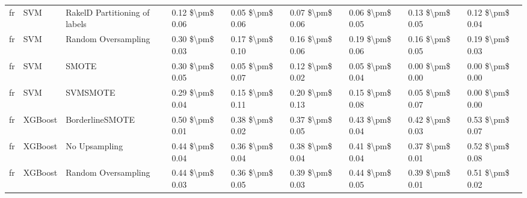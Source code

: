 \begin{tabular}{lllllllll}
      fr &                             SVM & RakelD Partitioning of labels & 0.12 \$\textbackslash pm\$ 0.06 &           0.05 \$\textbackslash pm\$ 0.06 &       0.07 \$\textbackslash pm\$ 0.06 &        0.06 \$\textbackslash pm\$ 0.05 &                         0.13 \$\textbackslash pm\$ 0.05 &     0.12 \$\textbackslash pm\$ 0.04 \\
      fr &                             SVM &           Random Oversampling & 0.30 \$\textbackslash pm\$ 0.03 &           0.17 \$\textbackslash pm\$ 0.10 &       0.16 \$\textbackslash pm\$ 0.06 &        0.19 \$\textbackslash pm\$ 0.06 &                         0.16 \$\textbackslash pm\$ 0.05 &     0.19 \$\textbackslash pm\$ 0.03 \\
      fr &                             SVM &                         SMOTE & 0.30 \$\textbackslash pm\$ 0.05 &           0.05 \$\textbackslash pm\$ 0.07 &       0.12 \$\textbackslash pm\$ 0.02 &        0.05 \$\textbackslash pm\$ 0.04 &                         0.00 \$\textbackslash pm\$ 0.00 &     0.00 \$\textbackslash pm\$ 0.00 \\
      fr &                             SVM &                      SVMSMOTE & 0.29 \$\textbackslash pm\$ 0.04 &           0.15 \$\textbackslash pm\$ 0.11 &       0.20 \$\textbackslash pm\$ 0.13 &        0.15 \$\textbackslash pm\$ 0.08 &                         0.05 \$\textbackslash pm\$ 0.07 &     0.00 \$\textbackslash pm\$ 0.00 \\
      fr &                         XGBoost &               BorderlineSMOTE & 0.50 \$\textbackslash pm\$ 0.01 &           0.38 \$\textbackslash pm\$ 0.02 &       0.37 \$\textbackslash pm\$ 0.05 &        0.43 \$\textbackslash pm\$ 0.04 &                         0.42 \$\textbackslash pm\$ 0.03 &     0.53 \$\textbackslash pm\$ 0.07 \\
      fr &                         XGBoost &                 No Upsampling & 0.44 \$\textbackslash pm\$ 0.04 &           0.36 \$\textbackslash pm\$ 0.04 &       0.38 \$\textbackslash pm\$ 0.04 &        0.41 \$\textbackslash pm\$ 0.04 &                         0.37 \$\textbackslash pm\$ 0.01 &     0.52 \$\textbackslash pm\$ 0.08 \\
      fr &                         XGBoost &           Random Oversampling & 0.44 \$\textbackslash pm\$ 0.03 &           0.36 \$\textbackslash pm\$ 0.05 &       0.39 \$\textbackslash pm\$ 0.03 &        0.44 \$\textbackslash pm\$ 0.05 &                         0.39 \$\textbackslash pm\$ 0.01 &     0.51 \$\textbackslash pm\$ 0.02 \\

\end{tabular}

